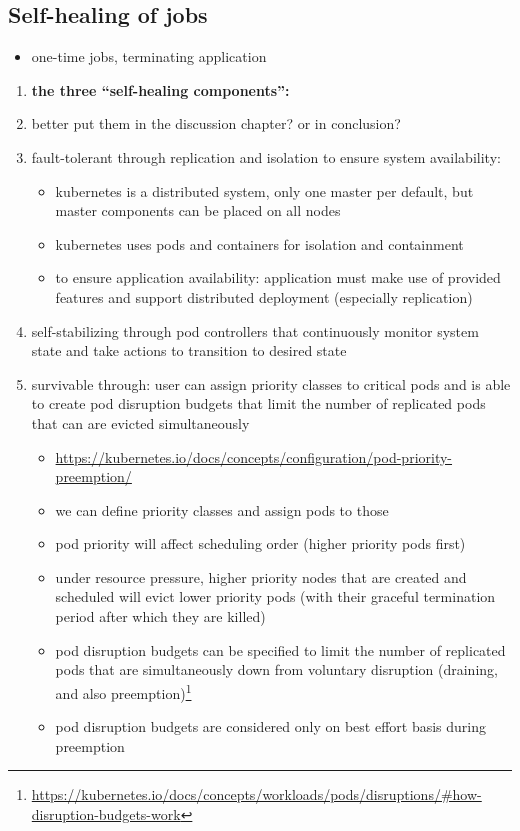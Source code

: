   \subsection{Self-healing of jobs}
    \begin{itemize}
      \item one-time jobs, terminating application
    \end{itemize}

  \begin{enumerate}
    \item \textbf{the three \enquote{self-healing components}:}
    \item better put them in the discussion chapter? or in conclusion?
    \item fault-tolerant through replication and isolation to ensure system availability:
      \begin{itemize}
      \item \gls{kubernetes} is a distributed system, only one master per default, but master components can be placed on all nodes
      \item \gls{kubernetes} uses pods and containers for isolation and containment
      \item to ensure application availability: application must make use of provided features and support distributed deployment (especially replication)
    \end{itemize}
    \item self-stabilizing through pod controllers that continuously monitor system state and take actions to transition to desired state
    \item survivable through: user can assign priority classes to critical pods and is able to create pod disruption budgets that limit the number of replicated pods that can are evicted simultaneously
      \begin{itemize}
        \item \url{https://kubernetes.io/docs/concepts/configuration/pod-priority-preemption/}
        \item we can define priority classes and assign pods to those
        \item pod priority will affect scheduling order (higher priority pods first)
        \item under resource pressure, higher priority nodes that are created and scheduled will evict lower priority pods (with their graceful termination period after which they are killed)
        \item pod disruption budgets can be specified to limit the number of replicated pods that are simultaneously down from voluntary disruption (draining, and also preemption)\footnote{\url{https://kubernetes.io/docs/concepts/workloads/pods/disruptions/\#how-disruption-budgets-work}}
        \item pod disruption budgets are considered only on best effort basis during preemption
      \end{itemize}
  \end{enumerate}